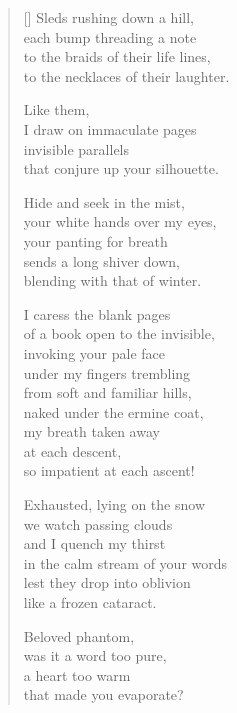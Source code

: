 \documentclass[twocolumn,12pt]{article}
\begin{document}
\thispagestyle{empty}

\poemtitle{}

\settowidth{\versewidth}{in the calm stream of your words}

\bigskip

\begin{verse}[\versewidth]
  Sleds rushing down a hill, \\
  each bump threading a note \\
  to the braids of their life lines, \\
  to the necklaces of their laughter.

  Like them, \\
  I draw on immaculate pages \\
  invisible parallels \\
  that conjure up your silhouette.

  Hide and seek in the mist, \\
  your white hands over my eyes, \\
  your panting for breath \\
  sends a long shiver down, \\
  blending with that of winter.

  I caress the blank pages \\
  of a book open to the invisible, \\
  invoking your pale face \\
  under my fingers trembling \\
  from soft and familiar hills, \\
  naked under the ermine coat, \\
  my breath taken away \\
  at each descent, \\
  so impatient at each ascent!

  Exhausted, lying on the snow \\
  we watch passing clouds \\
  and I quench my thirst \\
  in the calm stream of your words \\
  lest they drop into oblivion \\
  like a frozen cataract.

  \newpage

  Beloved phantom, \\
  was it a word too pure, \\
  a heart too warm \\
  that made you evaporate?


\end{verse}
\end{document}
